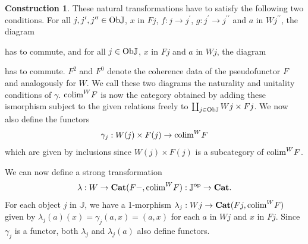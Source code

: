 \documentclass[12pt,oneside,reqno,a4paper]{article}
\theoremstyle{definition}
\newtheorem{construction}[theorem]{Construction}
\newcommand{\op}{^\textup{op}}
\newcommand{\Ob}{\textup{Ob}}
\newcommand{\Cat}{\textbf{\textup{Cat}}}
\newcommand{\id}{\textup{id}}
\newcommand{\bJ}{\mathbb{J}}
\newcommand{\p}{^\prime}
\newcommand{\pp}{^{\prime\prime}}
\newcommand{\colim}{\textup{colim}}
\begin{document}
\begin{construction}
These natural transformations have to satisfy the following two conditions. For all $j,j\p,j\pp\in\Ob\bJ$, $x$ in $Fj$, $f:j\to j\p$, $g:j\p\to j\pp$ and $a$ in $Wj\pp$, the diagram
\begin{center}
\end{center}
has to commute, and for all $j\in\Ob\bJ$, $x$ in $Fj$ and $a$ in $Wj$, the diagram
\begin{center}
\end{center}
has to commute. $F^2$ and $F^0$ denote the coherence data of the pseudofunctor $F$ and analogously for $W$. We call these two diagrams the naturality and unitality conditions of $\gamma$. $\colim^W F$ is now the category obtained by adding these ismorphism subject to the given relations freely to $\coprod_{j \in \Ob\bJ}Wj\times Fj$. We now also define the functors
\begin{align*}
\gamma_j:W(j)\times F(j) \to \colim^W F
\end{align*}
which are given by inclusions since $W(j)\times F(j)$ is a subcategory of $\colim^W F$.

We can now define a strong transformation
\begin{align*}
\lambda:W\to \Cat(F-,\colim^W F):\bJ\op\to\Cat.
\end{align*}
For each object $j$ in $\bJ$, we have a 1-morphism $\lambda_j:Wj\to \Cat(Fj,\colim^W F)$ given by $\lambda_j(a)(x)=\gamma_j(a,x)=(a,x)$
for each $a$ in $Wj$ and $x$ in $Fj$. Since $\gamma_j$ is a functor, both $\lambda_j$ and $\lambda_j(a)$ also define functors.


\end{construction}
\end{document}
